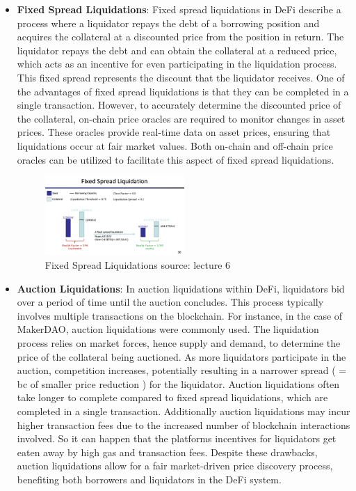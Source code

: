 \documentclass{article}
\begin{document}
\begin{itemize}

\item \textbf{Fixed Spread Liquidations}:%
Fixed spread liquidations in DeFi describe a process where a liquidator repays the debt of a borrowing position and acquires the collateral at a discounted price from the position in return. The liquidator repays the debt and can obtain the collateral at a reduced price, which acts as an incentive for even participating in the liquidation process. This fixed spread represents the discount that the liquidator receives. One of the advantages of fixed spread liquidations is that they can be completed in a single transaction. However, to accurately determine the discounted price of the collateral, on-chain price oracles are required to monitor changes in asset prices. These oracles provide real-time data on asset prices, ensuring that liquidations occur at fair market values. Both on-chain and off-chain price oracles can be utilized to facilitate this aspect of fixed spread liquidations.
\begin{figure}[h]
    \centering
    \includegraphics[width=0.5\textwidth]{Bildschirmfoto 2024-04-07 um 17.47.44.png} 
    \caption{Fixed Spread Liquidations \scriptsize{source: lecture 6}}
    \label{fig:DoS-attack}
\end{figure}


\item \textbf{Auction Liquidations}:%
In auction liquidations within DeFi, liquidators bid over a period of time  until the auction concludes. This process typically involves multiple transactions on the blockchain. For instance, in the case of MakerDAO, auction liquidations were commonly used. The liquidation process relies on market forces, hence supply and demand, to determine the price of the collateral being auctioned. As more liquidators participate in the auction, competition increases, potentially resulting in a narrower spread ( = bc of smaller price reduction ) for the liquidator. Auction liquidations often take longer to complete compared to fixed spread liquidations, which are completed in a single transaction. Additionally auction liquidations may incur higher transaction fees due to the increased number of blockchain interactions involved. So it can happen that the platforms incentives for liquidators get eaten away by high gas and transaction fees. Despite these drawbacks, auction liquidations allow for a fair market-driven price discovery process, benefiting both borrowers and liquidators in the DeFi system.


\end{itemize}
\end{document}
